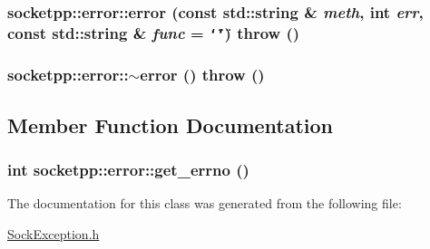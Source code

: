 \hypertarget{classsocketpp_1_1error_1287e8ec1ff5f7b18d91ea65c2505ae8}{
\subsubsection[{error}]{\setlength{\rightskip}{0pt plus 5cm}socketpp::error::error (const std::string \& {\em meth}, \/  int {\em err}, \/  const std::string \& {\em func} = {\tt \char`\"{}\char`\"{}})  throw ()}}
\label{classsocketpp_1_1error_1287e8ec1ff5f7b18d91ea65c2505ae8}


\hypertarget{classsocketpp_1_1error_f41562a951322078eff6f56268f2f257}{
\subsubsection[{$\sim$error}]{\setlength{\rightskip}{0pt plus 5cm}socketpp::error::$\sim$error ()  throw ()}}
\label{classsocketpp_1_1error_f41562a951322078eff6f56268f2f257}




\subsection{Member Function Documentation}
\hypertarget{classsocketpp_1_1error_e1d23816909f2663b5553d232110442b}{
\subsubsection[{get\_\-errno}]{\setlength{\rightskip}{0pt plus 5cm}int socketpp::error::get\_\-errno ()}}
\label{classsocketpp_1_1error_e1d23816909f2663b5553d232110442b}




The documentation for this class was generated from the following file:\begin{CompactItemize}
\item 
\hyperlink{SockException_8h}{SockException.h}\end{CompactItemize}
